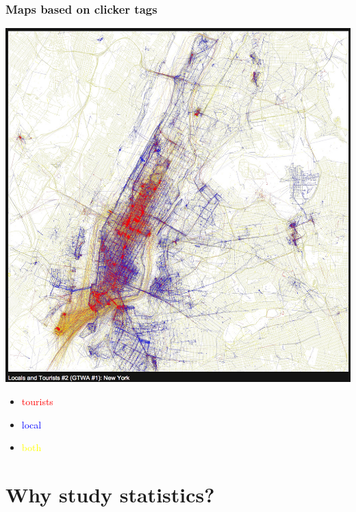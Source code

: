 \documentclass[11pt,containsverbatim,handout,xcolor=xelatex,dvipsnames,table]{beamer}
\begin{document}
\begin{frame}
\frametitle{Maps based on clicker tags}

{
\begin{center}
\includegraphics[width=\textwidth]{figures/flickr_ny}
\end{center}
}
{
\begin{itemize}
\item[] \textcolor{red}{tourists}
\item[] \textcolor{blue}{local}
\item[] \textcolor{yellow}{both}
\end{itemize}
}


\end{frame}


\section{Why study statistics?}

\end{document}
